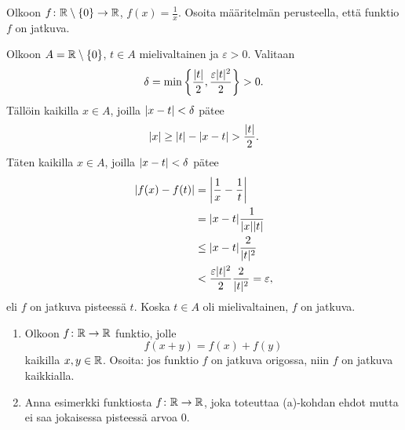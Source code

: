 \documentclass[11pt,a4paper]{amsart}
\begin{document}
\begin{exercise}
  Olkoon \(f\colon \RR \setminus \set{0} \to \RR\),
  \(f(x) = \frac{1}{x}\). Osoita määritelmän perusteella, että funktio
  \(f\) on jatkuva.
\end{exercise}

\begin{solution}
  Olkoon \(A = \RR \setminus \set{0}\), \(t \in A\) mielivaltainen ja
  \(\varepsilon > 0\). Valitaan
  \[
    \delta = \minset{\frac{\abs{t}}{2}, \frac{\varepsilon\abs{t}^2}{2}} > 0.
  \]
  Tällöin kaikilla \(x \in A\), joilla \(\abs{x - t}
  < \delta\) pätee
  \[
    \abs{x} \geq \abs{t} - \abs{x - t} > \frac{\abs{t}}{2}.
  \]
  Täten kaikilla \(x \in A\), joilla \(\abs{x - t} < \delta\) pätee
  \[
    \begin{aligned}
      \abs{f(x) - f(t)} &= \abs*{\frac{1}{x} - \frac{1}{t}} \\
      &= \abs{x - t}\frac{1}{\abs{x}\abs{t}} \\
      &\leq \abs{x - t}\frac{2}{\abs{t}^2} \\
      &< \frac{\varepsilon\abs{t}^2}{2}\frac{2}{\abs{t}^2}
      = \varepsilon,
    \end{aligned}
  \]
  eli \(f\) on jatkuva pisteessä \(t\). Koska \(t \in A\) oli
  mielivaltainen, \(f\) on jatkuva.
\end{solution}

\begin{exercise}
  \leavevmode\par
  \begin{enumerate}[label=(\alph*), nosep]
    \item Olkoon \(f\colon \RR \to \RR\) funktio, jolle
      \[
        f(x+y) = f(x) + f(y)
      \]
      kaikilla \(x,y \in \RR\). Osoita: jos funktio \(f\) on jatkuva
      origossa, niin \(f\) on jatkuva kaikkialla.
    \item Anna esimerkki funktiosta \(f\colon \RR \to \RR\), joka toteuttaa
      (a)-kohdan ehdot mutta ei saa jokaisessa pisteessä arvoa \(0\).
  \end{enumerate}
\end{exercise}
\end{document}
